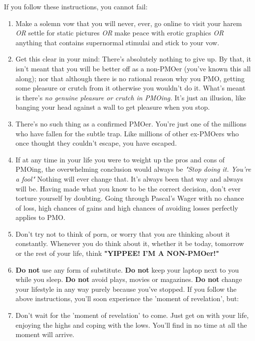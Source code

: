 \documentclass[easypeasy.tex]{subfiles}
\begin{document}
  If you follow these instructions, you cannot fail:
\begin{enumerate}
  \item Make a solemn vow that you will never, ever, go online to visit your harem \textit{OR} settle for static pictures \textit{OR} make peace with erotic graphics \textit{OR} anything that contains supernormal stimulai and stick to your vow.

    \item Get this clear in your mind: There's absolutely nothing to give up. By that, it isn't meant that you will be better off as a non-PMOer (you've known this all along); nor that although there is no rational reason why you PMO, getting some pleasure or crutch from it otherwise you wouldn't do it. What's meant is there's \textit{no genuine pleasure or crutch in PMOing.} It's just an illusion, like banging your head against a wall to get pleasure when you stop.

    \item There's no such thing as a confirmed PMOer. You're just one of the millions who have fallen for the subtle trap. Like millions of other ex-PMOers who once thought they couldn't escape, you have escaped.

    \item If at any time in your life you were to weight up the pros and cons of PMOing, the overwhelming conclusion would always be \textit{"Stop doing it. You're a fool"} Nothing will ever change that. It's always been that way and always will be. Having made what you know to be the correct decision, don't ever torture yourself by doubting. Going through Pascal's Wager with no chance of loss, high chances of gains and high chances of avoiding losses perfectly applies to PMO.

    \item Don't try not to think of porn, or worry that you are thinking about it constantly. Whenever you do think about it, whether it be today, tomorrow or the rest of your life, think \textbf{"YIPPEE! I'M A NON-PMOer!"}

    \item \textbf{Do not} use any form of substitute. \textbf{Do not} keep your laptop next to you while you sleep. \textbf{Do not} avoid plays, movies or magazines. \textbf{Do not} change your lifestyle in any way purely because you've stopped. If you follow the above instructions, you'll soon experience the 'moment of revelation', but:

    \item Don't wait for the 'moment of revelation' to come. Just get on with your life, enjoying the highs and coping with the lows. You'll find in no time at all the moment will arrive.
\end{enumerate}
\end{document}
